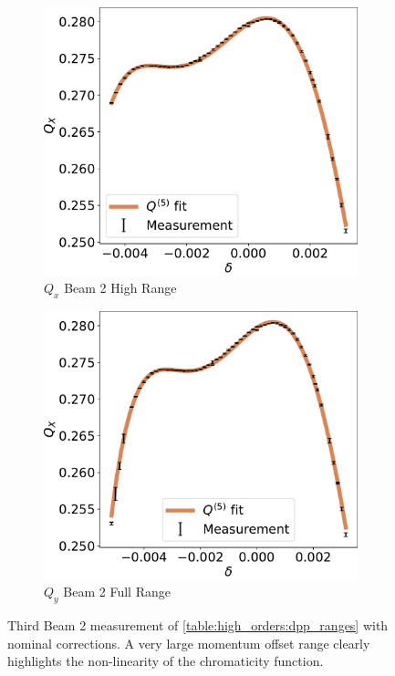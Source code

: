 \begin{figure}[!htb]
    \begin{subfigure}{0.49\textwidth}
        \centering
        \includegraphics[width=\textwidth]{./images/chromaticity_further/q5_range/Beam2_Qx_full_but_not_quite.pdf}
        \caption{$Q_x$ Beam 2 High Range}
    \end{subfigure}
    \hfill
    \begin{subfigure}{0.49\textwidth}
        \centering
        \includegraphics[width=\textwidth]{./images/chromaticity_further/q5_range/Beam2_Qx_full.pdf}
        \caption{$Q_y$ Beam 2 Full Range}
    \end{subfigure}
    \caption{Third Beam 2 measurement of \cref{table:high_orders:dpp_ranges} with nominal
    corrections. A very large momentum offset range clearly highlights the non-linearity of the
    chromaticity function.}
    \label{fig:high_orders:chroma_nominal_correction_full_range}
\end{figure}

